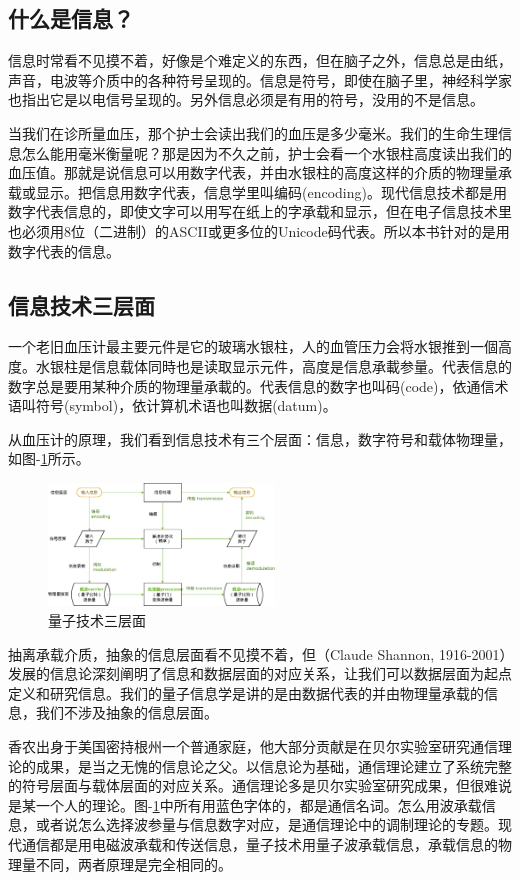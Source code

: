 \documentclass{ctexbook}
\begin{document}
\subsection{什么是信息？}
信息时常看不见摸不着，好像是个难定义的东西，但在脑子之外，信息总是由纸，声音，电波等介质中的各种符号呈现的。信息是符号，即使在脑子里，神经科学家也指出它是以电信号呈现的。另外信息必须是有用的符号，没用的不是信息。

当我们在诊所量血压，那个护士会读出我们的血压是多少毫米。我们的生命生理信息怎么能用毫米衡量呢？那是因为不久之前，护士会看一个水银柱高度读出我们的血压值。那就是说信息可以用数字代表，并由水银柱的高度这样的介质的物理量承载或显示。把信息用数字代表，信息学里叫编码(encoding)。现代信息技术都是用数字代表信息的，即使文字可以用写在纸上的字承载和显示，但在电子信息技术里也必须用8位（二进制）的ASCII或更多位的Unicode码代表。所以本书针对的是用数字代表的信息。

\subsection{信息技术三层面}
一个老旧血压计最主要元件是它的玻璃水银柱，人的血管压力会将水银推到一個高度。水银柱是信息载体同時也是读取显示元件，高度是信息承載参量。代表信息的数字总是要用某种介质的物理量承載的。代表信息的数字也叫码(code)，依通信术语叫符号(symbol)，依计算机术语也叫数据(datum)。

从血压计的原理，我们看到信息技术有三个层面：信息，数字符号和载体物理量，如图-\ref{fig:3levels}所示。

\begin{figure}\label{fig:3levels}
    \centering
    \includegraphics[width=6cm]{pic/qinfo_flow.eps}
    \caption{量子技术三层面}
\end{figure}

抽离承载介质，抽象的信息层面看不见摸不着，但（Claude Shannon, 1916-2001）发展的信息论深刻阐明了信息和数据层面的对应关系，让我们可以数据层面为起点定义和研究信息。我们的量子信息学是讲的是由数据代表的并由物理量承载的信息，我们不涉及抽象的信息层面。

香农出身于美国密持根州一个普通家庭，他大部分贡献是在贝尔实验室研究通信理论的成果，是当之无愧的信息论之父。以信息论为基础，通信理论建立了系统完整的符号层面与载体层面的对应关系。通信理论多是贝尔实验室研究成果，但很难说是某一个人的理论。图-\ref{fig:3levels}中所有用蓝色字体的，都是通信名词。怎么用波承载信息，或者说怎么选择波参量与信息数字对应，是通信理论中的调制理论的专题。现代通信都是用电磁波承载和传送信息，量子技术用量子波承载信息，承载信息的物理量不同，两者原理是完全相同的。
\end{document}
